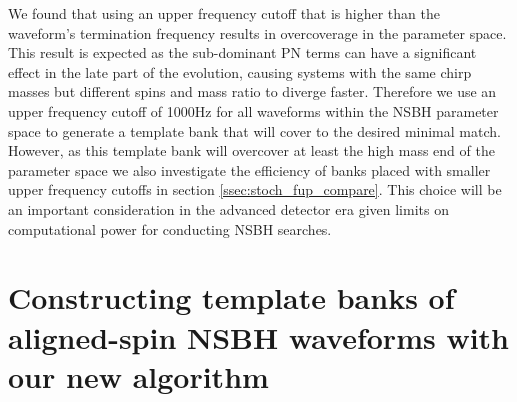 We found that using an upper frequency cutoff that is higher than the waveform's
termination frequency results in overcoverage in the parameter space. This 
result is expected as the sub-dominant \ac{PN} terms can have a
significant effect in the late part of the evolution, causing
systems with the same chirp masses but different spins and mass ratio to diverge
faster. Therefore we use an upper frequency cutoff of 1000Hz for all waveforms
within the \ac{NSBH} parameter space to generate a template bank that will cover
to the desired minimal match. However, as this template bank will overcover
at least the high mass end of the parameter space we also investigate the
efficiency of banks placed with smaller upper frequency cutoffs in section
\ref{ssec:stoch_fup_compare}. This choice will be an important consideration
in the advanced detector era given limits on computational power for conducting
\ac{NSBH} searches.

\section{Constructing template banks of aligned-spin NSBH waveforms with our 
new algorithm}
\label{sec:bank_construction}

